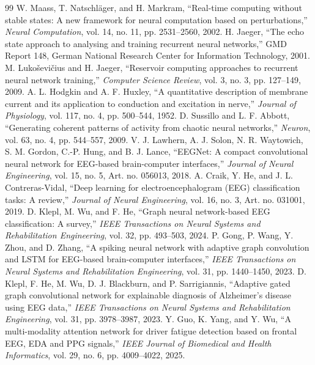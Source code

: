 \documentclass[journal]{IEEEtran}
\begin{document}
\balance
\begin{thebibliography}{99}
 W. Maass, T. Natschl\"ager, and H. Markram, ``Real-time computing without stable states: A new framework for neural computation based on perturbations,'' \emph{Neural Computation}, vol. 14, no. 11, pp. 2531--2560, 2002.
 H. Jaeger, ``The echo state approach to analysing and training recurrent neural networks,'' GMD Report 148, German National Research Center for Information Technology, 2001.
 M. Luko\v{s}evi\v{c}ius and H. Jaeger, ``Reservoir computing approaches to recurrent neural network training,'' \emph{Computer Science Review}, vol. 3, no. 3, pp. 127--149, 2009.
 A. L. Hodgkin and A. F. Huxley, ``A quantitative description of membrane current and its application to conduction and excitation in nerve,'' \emph{Journal of Physiology}, vol. 117, no. 4, pp. 500--544, 1952.
 D. Sussillo and L. F. Abbott, ``Generating coherent patterns of activity from chaotic neural networks,'' \emph{Neuron}, vol. 63, no. 4, pp. 544--557, 2009.
 V. J. Lawhern, A. J. Solon, N. R. Waytowich, S. M. Gordon, C.-P. Hung, and B. J. Lance, ``EEGNet: A compact convolutional neural network for EEG-based brain-computer interfaces,'' \emph{Journal of Neural Engineering}, vol. 15, no. 5, Art. no. 056013, 2018.
 A. Craik, Y. He, and J. L. Contreras-Vidal, ``Deep learning for electroencephalogram (EEG) classification tasks: A review,'' \emph{Journal of Neural Engineering}, vol. 16, no. 3, Art. no. 031001, 2019.
 D. Klepl, M. Wu, and F. He, ``Graph neural network-based EEG classification: A survey,'' \emph{IEEE Transactions on Neural Systems and Rehabilitation Engineering}, vol. 32, pp. 493--503, 2024.
 P. Gong, P. Wang, Y. Zhou, and D. Zhang, ``A spiking neural network with adaptive graph convolution and LSTM for EEG-based brain-computer interfaces,'' \emph{IEEE Transactions on Neural Systems and Rehabilitation Engineering}, vol. 31, pp. 1440--1450, 2023.
 D. Klepl, F. He, M. Wu, D. J. Blackburn, and P. Sarrigiannis, ``Adaptive gated graph convolutional network for explainable diagnosis of Alzheimer's disease using EEG data,'' \emph{IEEE Transactions on Neural Systems and Rehabilitation Engineering}, vol. 31, pp. 3978--3987, 2023.
 Y. Guo, K. Yang, and Y. Wu, ``A multi-modality attention network for driver fatigue detection based on frontal EEG, EDA and PPG signals,'' \emph{IEEE Journal of Biomedical and Health Informatics}, vol. 29, no. 6, pp. 4009--4022, 2025.

\end{thebibliography}
\end{document}
